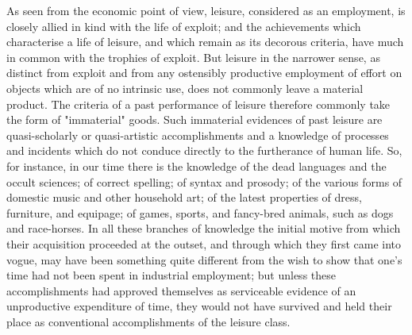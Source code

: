 \documentclass[12pt]{report}
\begin{document}
As seen from the economic point of view, leisure, considered as an
employment, is closely allied in kind with the life of exploit; and the
achievements which characterise a life of leisure, and which remain as
its decorous criteria, have much in common with the trophies of exploit.
But leisure in the narrower sense, as distinct from exploit and from any
ostensibly productive employment of effort on objects which are of no
intrinsic use, does not commonly leave a material product. The criteria
of a past performance of leisure therefore commonly take the form
of "immaterial" goods. Such immaterial evidences of past leisure are
quasi-scholarly or quasi-artistic accomplishments and a knowledge of
processes and incidents which do not conduce directly to the furtherance
of human life. So, for instance, in our time there is the knowledge
of the dead languages and the occult sciences; of correct spelling; of
syntax and prosody; of the various forms of domestic music and other
household art; of the latest properties of dress, furniture, and
equipage; of games, sports, and fancy-bred animals, such as dogs and
race-horses. In all these branches of knowledge the initial motive from
which their acquisition proceeded at the outset, and through which they
first came into vogue, may have been something quite different from
the wish to show that one's time had not been spent in industrial
employment; but unless these accomplishments had approved themselves as
serviceable evidence of an unproductive expenditure of time, they would
not have survived and held their place as conventional accomplishments
of the leisure class.
\end{document}

